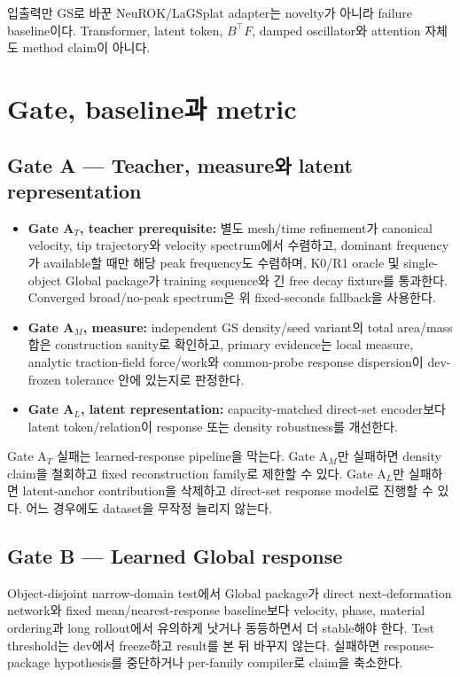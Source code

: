 \documentclass[11pt]{article}
\begin{document}
입출력만 GS로 바꾼 NeuROK/LaGSplat adapter는 novelty가 아니라 failure baseline이다.
Transformer, latent token, \(B^\top F\), damped oscillator와 attention 자체도 method claim이 아니다.

\section{Gate, baseline과 metric}

\subsection{Gate A --- Teacher, measure와 latent representation}

\begin{itemize}
  \item \textbf{Gate A\(_T\), teacher prerequisite:} 별도 mesh/time refinement가 canonical velocity,
  tip trajectory와 velocity spectrum에서 수렴하고, dominant frequency가 available할 때만 해당 peak
  frequency도 수렴하며, K0/R1 oracle 및 single-object Global package가 training sequence와 긴
  free decay fixture를 통과한다. Converged broad/no-peak spectrum은 위 fixed-seconds fallback을 사용한다.
  \item \textbf{Gate A\(_M\), measure:} independent GS density/seed variant의 total area/mass 합은
  construction sanity로 확인하고, primary evidence는 local measure, analytic traction-field force/work와
  common-probe response dispersion이 dev-frozen tolerance 안에 있는지로 판정한다.
  \item \textbf{Gate A\(_L\), latent representation:} capacity-matched direct-set encoder보다 latent token/relation이
  response 또는 density robustness를 개선한다.
\end{itemize}
Gate A\(_T\) 실패는 learned-response pipeline을 막는다. Gate A\(_M\)만 실패하면 density claim을 철회하고
fixed reconstruction family로 제한할 수 있다. Gate A\(_L\)만 실패하면 latent-anchor contribution을 삭제하고
direct-set response model로 진행할 수 있다. 어느 경우에도 dataset을 무작정 늘리지 않는다.

\subsection{Gate B --- Learned Global response}

Object-disjoint narrow-domain test에서 Global package가 direct next-deformation network와
fixed mean/nearest-response baseline보다 velocity, phase, material ordering과 long rollout에서 유의하게 낫거나
동등하면서 더 stable해야 한다. Test threshold는 dev에서 freeze하고 result를 본 뒤 바꾸지 않는다.
실패하면 response-package hypothesis를 중단하거나 per-family compiler로 claim을 축소한다.
\end{document}
